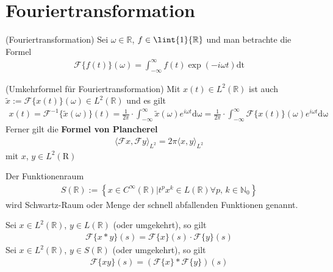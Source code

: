 \chapter{Fouriertransformation}\label{ft}
\begin{satz}\label{ft:def:fourier}(Fouriertransformation) Sei $\omega \in \mathbb{R}$, $f \in \lint{1}{\mathbb{R}}$ und man betrachte die Formel
\begin{align}
	\mathscr{F}\{f(t)\}(\omega) = \int_{-\infty}^{\infty}{f(t) \exp{(-i \omega t)}} \mathrm{dt}
\end{align}
\end{satz}\cite[Seite 1163]{Mathe2012}
\begin{satz}(Umkehrformel für Fouriertransformation)\label{ft:umkehr}
Mit $x(t) \in L^2(\mathbb{R})$ ist auch $\tilde{x}:=\mathscr{F} \{x(t)\}(\omega) \in L^2(\mathbb{R})$ und es gilt
\begin{align}
	x(t) = \mathscr{F}^{-1}\{\tilde{x}(\omega)\}(t) = \frac{1}{2 \pi} \cdot \int_{-\infty}^{\infty}{\tilde{x}(\omega) e^{i \omega t}} \mathrm{d\omega} =  \frac{1}{2 \pi} \cdot \int_{-\infty}^{\infty}{\mathscr{F} \{x(t)\}(\omega) e^{i \omega t}} \mathrm{d\omega}
\end{align}
Ferner gilt die \textbf{Formel von Plancherel}
\begin{align}\label{ft:plancherel}
\langle \mathscr{F}x, \mathscr{F}y \rangle_{L^2} = 2 \pi \langle x, y \rangle_{L^2}
\end{align}
mit $x$, $y \in L^2(\mathrm{R})$ 
\end{satz}\cite[Seite 1163]{Mathe2012}
\begin{defi}
Der Funktionenraum 
\begin{align}
	S(\mathbb{R}):= \left\{x \in C^{\infty}(\mathbb{R}) \vert t^p x^{k} \in L(\mathbb{R}) \forall p\text{, } k \in \mathbb{N}_0\right\}
\end{align}
wird Schwartz-Raum oder Menge der schnell abfallenden Funktionen genannt.
\end{defi}
\begin{satz}
Sei $x \in L^2(\mathbb{R})$, $y \in L(\mathbb{R})$ (oder umgekehrt), so gilt 
\begin{align}
	\mathscr{F}\{x * y\}(s) = \mathscr{F}\{x\}(s) \cdot \mathscr{F}\{y\}(s)
\end{align}
Sei $x \in L^2(\mathbb{R})$, $y \in S(\mathbb{R})$ (oder umgekehrt), so gilt
\begin{align}
	\mathscr{F}\{x y\}(s) = (\mathscr{F}\{x\} * \mathscr{F}\{y\})(s)
\end{align}
\end{satz}
